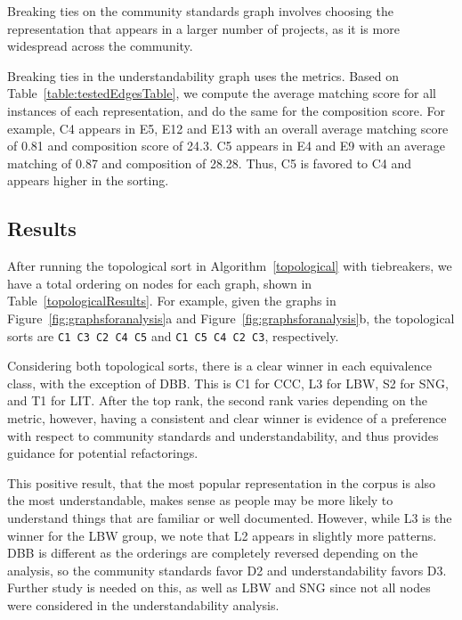 Breaking ties on the community standards graph involves choosing the representation that appears in a larger number of projects, as it is more widespread across the community. 

Breaking ties in the understandability graph uses the metrics. Based on Table~\ref{table:testedEdgesTable}, we compute the average matching score for all instances of each representation, and do the same for the composition score. For example, C4 appears in E5, E12 and E13 with an overall average matching score of 0.81 and composition score of 24.3. C5 appears in E4 and E9 with an average matching of 0.87 and composition of 28.28. Thus, C5 is favored to C4 and appears higher in the sorting.

\subsection{Results}
After running the topological sort in Algorithm~\ref{topological} with tiebreakers, we have a total ordering on nodes for each graph, shown in Table~\ref{topologicalResults}.  For example, given the graphs in Figure~\ref{fig:graphsforanalysis}a and Figure~\ref{fig:graphsforanalysis}b, the topological sorts are {\tt C1 C3 C2 C4 C5} and {\tt C1 C5 C4 C2 C3}, respectively.



Considering both topological sorts, there is a clear winner in each equivalence class, with the exception of DBB.
This is C1 for CCC, L3 for LBW, S2 for SNG, and T1 for LIT.
After the top rank, the second rank varies depending on the metric, however, having a consistent and clear winner is evidence of a preference with respect to community standards and understandability, and thus provides guidance for potential refactorings.

This positive result, that the most popular representation in the corpus is also the most understandable, makes sense as people may be more likely to understand things that are familiar or well documented. However, while L3 is the winner for the LBW group, we note that L2 appears in slightly more patterns.
DBB is different  as the orderings are completely reversed depending on the analysis, so the community standards favor D2 and understandability favors D3. Further study is needed on this, as well as  LBW and SNG since not all nodes were considered in the understandability analysis. 


